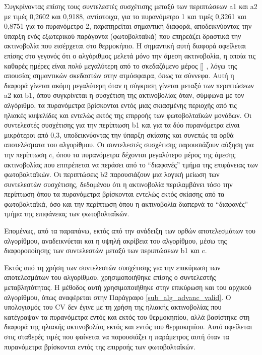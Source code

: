 \documentclass[12pt, a4paper]{report} %
\DeclareRobustCommand{\lcitep}[1]{%
  \english{[\cite{#1}]}%
}
\newcommand{\english}{\foreignlanguage{english}}
\begin{document}
Συγκρίνοντας επίσης τους συντελεστές συσχέτισης μεταξύ των περιπτώσεων \english{a1} και \english{a2} με τιμές 0,2602 και 0,9188, 
αντίστοιχα, για το πυρανόμετρο 1 και τιμές 0,3261 και 0,8751 για το πυρανόμετρο 2, παρατηρείται σημαντική διαφορά, 
αποδεικνύοντας την ύπαρξη ενός εξωτερικού παράγοντα (φωτοβολταϊκά) που επηρεάζει δραστικά την ακτινοβολία που εισέρχεται 
στο θερμοκήπιο. Η σημαντική αυτή διαφορά οφείλεται επίσης στο γεγονός ότι ο αλγόριθμος μελετά μόνο την άμεση ακτινοβολία, 
η οποία τις καθαρές ημέρες είναι πολύ μεγαλύτερη από το σκεδαζόμενο μέρος \lcitep{alg_adv_bib6,alg_adv_bib7}, λόγω της απουσίας 
σημαντικών σκεδαστών στην ατμόσφαιρα, όπως τα σύννεφα. Αυτή η διαφορά γίνεται ακόμη μεγαλύτερη όταν η σύγκριση γίνεται μεταξύ 
των περιπτώσεων \english{a2} και \english{b1}, όπου συγκρίνεται η συσχέτιση της ακτινοβολίας όταν, σύμφωνα με τον αλγόριθμο, 
τα πυρανόμετρα βρίσκονται εντός μιας σκιασμένης περιοχής από τις ηλιακές κυψελίδες και εντελώς εκτός της επιρροής των 
φωτοβολταϊκών μονάδων. Οι συντελεστές συσχέτισης για την περίπτωση \english{b1} και για τα δύο πυρανόμετρα είναι μικρότεροι 
από 0,3, υποδεικνύοντας την ύπαρξη σκίασης και συνεπώς τα ορθά αποτελέσματα του αλγορίθμου. Οι συντελεστές συσχέτισης 
παρουσιάζουν αύξηση για την περίπτωση \english{c}, όπου τα πυρανόμετρα δέχονται μεγαλύτερο μέρος της άμεσης ακτινοβολίας 
που επιτρέπεται να περάσει από το “διαφανές” τμήμα της επιφάνειας των φωτοβολταϊκών. Οι περιπτώσεις \english{b2} παρουσιάζουν 
μια λογική μείωση των συντελεστών συσχέτισης, δεδομένου ότι η ακτινοβολία περιλαμβάνει τόσο την περίπτωση όπου τα πυρανόμετρα 
βρίσκονται εντελώς εκτός σκίασης από τα φωτοβολταϊκά, όσο και την περίπτωση όπου η ακτινοβολία διαπερνά το “διαφανές” τμήμα 
της επιφάνειας των φωτοβολταϊκών.

Επομένως, από τα παραπάνω, εκτός από την ανάδειξη των ορθών αποτελεσμάτων του αλγορίθμου, αναδεικνύεται και η υψηλή ακρίβεια 
του αλγορίθμου, μέσω της διαφοροποίησης των συντελεστών μεταξύ των περιπτώσεων \english{b1} και \english{c}.

Εκτός από τη χρήση των συντελεστών συσχέτισης για την επικύρωση των αποτελεσμάτων του αλγορίθμου, χρησιμοποιήθηκε επίσης ο 
συντελεστής μεταβλητότητας. Η μέθοδος αυτή χρησιμοποιήθηκε στην επικύρωση και του αρχικού αλγορίθμου, όπως αναφέρεται στην 
Παράγραφο \ref{sub_alg_advanc_valid}. Ο υπολογισμός του \english{CV} δεν έγινε με τη χρήση της ηλιακής ακτινοβολίας που 
κατέγραψαν τα πυρανόμετρα εντός και εκτός του θερμοκηπίου, αλλά βασίστηκε στη διαφορά της ηλιακής ακτινοβολίας εκτός και 
εντός του θερμοκηπίου. Αυτό οφείλεται στις σταθερές τιμές που φαίνεται να παρουσιάζει η παράμετρος αυτή όταν τα πυρανόμετρα 
βρίσκονται εντός της επιρροής των φωτοβολταϊκών.
\end{document}
